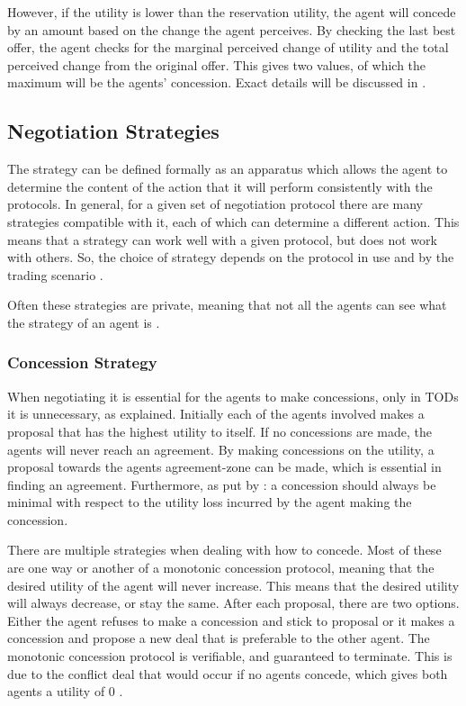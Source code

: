 However, if the utility is lower than the reservation utility, the agent will concede by an amount based on the change the agent perceives. By checking the last best offer, the agent checks for the marginal perceived change of utility and the total perceived change from the original offer. This gives two values, of which the maximum will be the agents' concession. Exact details will be discussed in .


\subsection{Negotiation Strategies}
The strategy can be defined formally as an apparatus which allows the agent to determine the content of the action that it will perform consistently with the protocols. In general, for a given set of negotiation protocol there are many strategies compatible with it, each of which can determine a different action. This means that a strategy can work well with a given protocol, but does not work with others. So, the choice of strategy depends on the protocol in use and by the trading scenario \citep{di2015multi}.

Often these strategies are private, meaning that not all the agents can see what the strategy of an agent is \citep{fatima2004agenda}. 

\subsubsection{Concession Strategy}
\label{sec:concessionstrat}
When negotiating it is essential for the agents to make concessions, only in TODs it is unnecessary, as explained. Initially each of the agents involved makes a proposal that has the highest utility to itself. If no concessions are made, the agents will never reach an agreement. By making concessions on the utility, a proposal towards the agents agreement-zone can be made, which is essential in finding an agreement. Furthermore, as put by \citet{endriss2006monotonic}: a concession should always be minimal with respect to the utility loss incurred by the agent making the concession.

There are multiple strategies when dealing with how to concede. Most of these are one way or another of a monotonic concession protocol, meaning that the desired utility of the agent will never increase. This means that the desired utility will always decrease, or stay the same. After each proposal, there are two options. Either the agent refuses to make a concession and stick to proposal or it makes a concession and propose a new deal that is preferable to the other agent. The monotonic concession protocol is verifiable, and guaranteed to terminate. This is due to the conflict deal that would occur if no agents concede, which gives both agents a utility of 0 \cite{endriss2006monotonic}.

